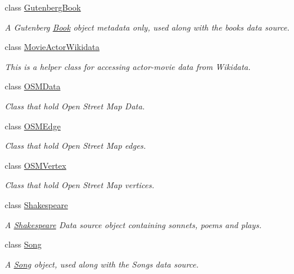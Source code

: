 \begin{DoxyCompactItemize}
class \hyperlink{classbridges_1_1dataset_1_1_gutenberg_book}{Gutenberg\+Book}
\begin{DoxyCompactList}\small\item\em A Gutenberg \hyperlink{classbridges_1_1dataset_1_1_book}{Book} object metadata only, used along with the books data source. \end{DoxyCompactList}\item 
class \hyperlink{classbridges_1_1dataset_1_1_movie_actor_wikidata}{Movie\+Actor\+Wikidata}
\begin{DoxyCompactList}\small\item\em This is a helper class for accessing actor-\/movie data from Wikidata. \end{DoxyCompactList}\item 
class \hyperlink{classbridges_1_1dataset_1_1_o_s_m_data}{O\+S\+M\+Data}
\begin{DoxyCompactList}\small\item\em Class that hold Open Street Map Data. \end{DoxyCompactList}\item 
class \hyperlink{classbridges_1_1dataset_1_1_o_s_m_edge}{O\+S\+M\+Edge}
\begin{DoxyCompactList}\small\item\em Class that hold Open Street Map edges. \end{DoxyCompactList}\item 
class \hyperlink{classbridges_1_1dataset_1_1_o_s_m_vertex}{O\+S\+M\+Vertex}
\begin{DoxyCompactList}\small\item\em Class that hold Open Street Map vertices. \end{DoxyCompactList}\item 
class \hyperlink{classbridges_1_1dataset_1_1_shakespeare}{Shakespeare}
\begin{DoxyCompactList}\small\item\em A \hyperlink{classbridges_1_1dataset_1_1_shakespeare}{Shakespeare} Data source object containing sonnets, poems and plays. \end{DoxyCompactList}\item 
class \hyperlink{classbridges_1_1dataset_1_1_song}{Song}
\begin{DoxyCompactList}\small\item\em A \hyperlink{classbridges_1_1dataset_1_1_song}{Song} object, used along with the Songs data source. \end{DoxyCompactList}\end{DoxyCompactItemize}
